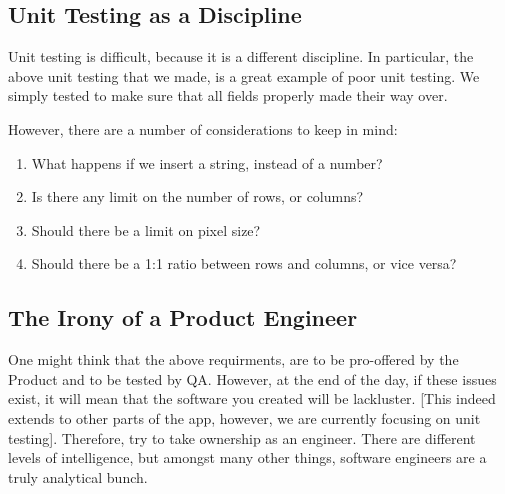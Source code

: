 \subsection{ Unit Testing as a Discipline }

Unit testing is difficult, because it is a different discipline. In particular,
the above unit testing that we made, is a great example of poor unit testing.
We simply tested to make sure that all fields properly made their way over.

However, there are a number of considerations to keep in mind:
\begin{enumerate}
  \item What happens if we insert a string, instead of a number?
  \item Is there any limit on the number of rows, or columns?
  \item Should there be a limit on pixel size?
  \item Should there be a 1:1 ratio between rows and columns, or vice versa?
\end{enumerate}

\subsection{ The Irony of a Product Engineer }
One might think that the above requirments, are to be pro-offered by the Product
and to be tested by QA. However, at the end of the day, if these issues exist,
it will mean that the software you created will be lackluster. [This indeed
extends to other parts of the app, however, we are currently focusing on
unit testing]. Therefore, try to take ownership as an engineer. There are
different levels of intelligence, but amongst many other things, software
engineers are a truly analytical bunch.
